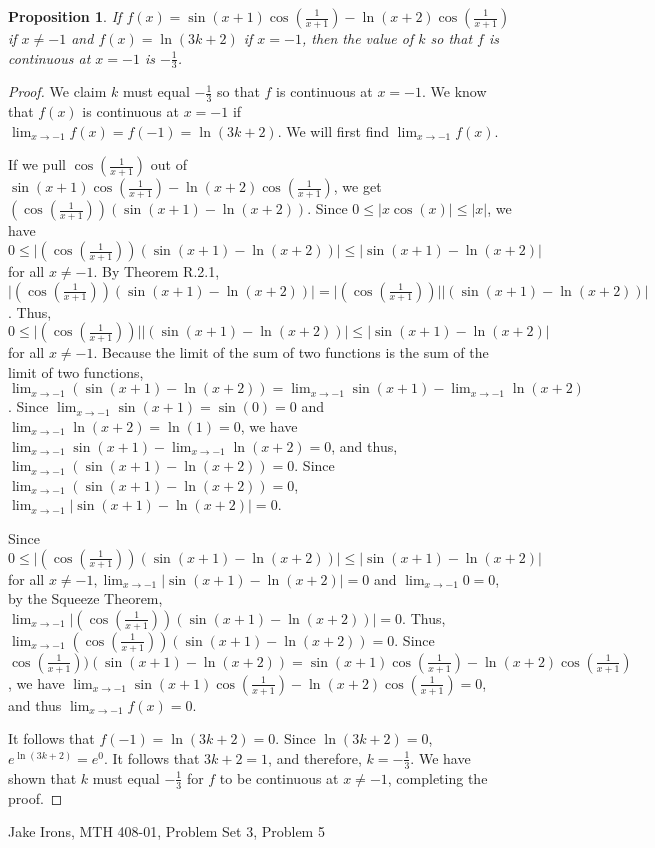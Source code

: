 \documentclass[11 pt]{article}
\newtheorem{proposition}{Proposition}
\newcommand{\newpar}{\vspace{.15in}\noindent}
\begin{document}
\newpar
\begin{proposition}
If $f(x)=\sin(x+1)\cos(\frac{1}{x+1})-\ln(x+2)\cos(\frac{1}{x+1})$ if $x\neq-1$ and $f(x)=\ln(3k+2)$ if $x=-1$, then the value of $k$ so that $f$ is continuous at $x=-1$ is $-\frac{1}{3}$. 
\end{proposition}
\begin{proof}
We claim $k$ must equal $-\frac{1}{3}$ so that $f$ is continuous at $x=-1$. We know that $f(x)$ is continuous at $x=-1$ if $\displaystyle{\lim_{x \to -1}}f(x)=f(-1)=\ln(3k+2)$. We will first find $\displaystyle{\lim_{x \to -1}}f(x)$.

\newpar
If we pull $\cos(\frac{1}{x+1})$ out of  $\sin(x+1)\cos(\frac{1}{x+1})-\ln(x+2)\cos(\frac{1}{x+1})$, we get $(\cos(\frac{1}{x+1}))(\sin(x+1)-\ln(x+2))$. Since $0\le\lvert x\cos(x)\rvert\le\lvert x\rvert$, we have $0\le\lvert (\cos(\frac{1}{x+1}))(\sin(x+1)-\ln(x+2))\rvert\le\lvert \sin(x+1)-\ln(x+2)\rvert$ for all $x\neq-1$. By Theorem R.2.1, $\lvert (\cos(\frac{1}{x+1}))(\sin(x+1)-\ln(x+2))\rvert=\lvert (\cos(\frac{1}{x+1}))\rvert\lvert (\sin(x+1)-\ln(x+2))\rvert$. Thus,$0\le\lvert (\cos(\frac{1}{x+1}))\rvert\lvert (\sin(x+1)-\ln(x+2))\rvert\le\lvert \sin(x+1)-\ln(x+2)\rvert$ for all $x\neq-1$.  Because the limit of the sum of two functions is the sum of the limit of two functions, $\displaystyle{\lim_{x \to -1}}(\sin(x+1)-\ln(x+2))=\displaystyle{\lim_{x \to -1}}\sin(x+1)-\displaystyle{\lim_{x \to -1}}\ln(x+2)$. Since $\displaystyle{\lim_{x \to -1}}\sin(x+1)=\sin(0)=0$ and $\displaystyle{\lim_{x \to -1}}\ln(x+2)=\ln(1)=0$, we have $\displaystyle{\lim_{x \to -1}}\sin(x+1)-\displaystyle{\lim_{x \to -1}}\ln(x+2)=0$, and thus, $\displaystyle{\lim_{x \to -1}}(\sin(x+1)-\ln(x+2))=0$. Since $\displaystyle{\lim_{x \to -1}}(\sin(x+1)-\ln(x+2))=0$, $\displaystyle{\lim_{x \to -1}}\lvert\sin(x+1)-\ln(x+2)\rvert=0$.

\newpar
Since $0\le\lvert (\cos(\frac{1}{x+1}))(\sin(x+1)-\ln(x+2))\rvert\le\lvert \sin(x+1)-\ln(x+2)\rvert$ for all $x\neq-1, \displaystyle{\lim_{x \to -1}}\lvert\sin(x+1)-\ln(x+2)\rvert=0$ and $\displaystyle{\lim_{x \to -1}}0=0$, by the Squeeze Theorem, $\displaystyle{\lim_{x \to -1}}\lvert (\cos(\frac{1}{x+1}))(\sin(x+1)-\ln(x+2))\rvert=0$. Thus, $\displaystyle{\lim_{x \to -1}} (\cos(\frac{1}{x+1}))(\sin(x+1)-\ln(x+2))=0$. Since $\cos(\frac{1}{x+1}))(\sin(x+1)-\ln(x+2))=\sin(x+1)\cos(\frac{1}{x+1})-\ln(x+2)\cos(\frac{1}{x+1})$, we have $\displaystyle{\lim_{x \to -1}}\sin(x+1)\cos(\frac{1}{x+1})-\ln(x+2)\cos(\frac{1}{x+1})=0$, and thus $\displaystyle{\lim_{x \to -1}}f(x)=0$.

\newpar
It follows that $f(-1)=\ln(3k+2)=0$. Since $\ln(3k+2)=0$, $e^{\ln(3k+2)}=e^0$. It follows that $3k+2=1$, and therefore, $k=-\frac{1}{3}$. We have shown that $k$ must equal $-\frac{1}{3}$ for $f$ to be continuous at $x\neq-1$, completing the proof.


\end{proof}
\newpage
\noindent Jake Irons, MTH 408-01, Problem Set 3, Problem 5
\end{document}
